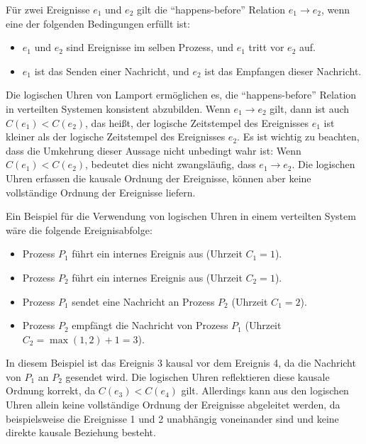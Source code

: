 \documentclass[../vs-script-first-v01.tex]{subfiles}
\begin{document}
Für zwei Ereignisse $e_1$ und $e_2$ gilt die \enquote{happens-before} Relation $e_1 \to e_2$, wenn eine der folgenden Bedingungen erfüllt ist:
\begin{itemize}
\item $e_1$ und $e_2$ sind Ereignisse im selben Prozess, und $e_1$ tritt vor $e_2$ auf.
\item $e_1$ ist das Senden einer Nachricht, und $e_2$ ist das Empfangen dieser Nachricht.
\end{itemize}  
Die logischen Uhren von Lamport ermöglichen es, die \enquote{happens-before} Relation in verteilten Systemen konsistent abzubilden. Wenn $e_1 \to e_2$ gilt, dann ist auch $C(e_1) < C(e_2)$, das heißt, der logische Zeitstempel des Ereignisses $e_1$ ist kleiner als der logische Zeitstempel des Ereignisses $e_2$. Es ist wichtig zu beachten, dass die Umkehrung dieser Aussage nicht unbedingt wahr ist: Wenn $C(e_1) < C(e_2)$, bedeutet dies nicht zwangsläufig, dass $e_1 \to e_2$. Die logischen Uhren erfassen die kausale Ordnung der Ereignisse, können aber keine vollständige Ordnung der Ereignisse liefern.

Ein Beispiel für die Verwendung von logischen Uhren in einem verteilten System wäre die folgende Ereignisabfolge:
\begin{itemize}
\item Prozess $P_1$ führt ein internes Ereignis aus (Uhrzeit $C_1 = 1$).
\item Prozess $P_2$ führt ein internes Ereignis aus (Uhrzeit $C_2 = 1$).
\item Prozess $P_1$ sendet eine Nachricht an Prozess $P_2$ (Uhrzeit $C_1 = 2$).
\item Prozess $P_2$ empfängt die Nachricht von Prozess $P_1$ (Uhrzeit $C_2 = \max(1, 2) + 1 = 3$).
\end{itemize}  

In diesem Beispiel ist das Ereignis 3 kausal vor dem Ereignis 4, da die Nachricht von $P_1$ an $P_2$ gesendet wird. Die logischen Uhren reflektieren diese kausale Ordnung korrekt, da $C(e_3) < C(e_4)$ gilt. Allerdings kann aus den logischen Uhren allein keine vollständige Ordnung der Ereignisse abgeleitet werden, da beispielsweise die Ereignisse 1 und 2 unabhängig voneinander sind und keine direkte kausale Beziehung besteht.
\end{document}
